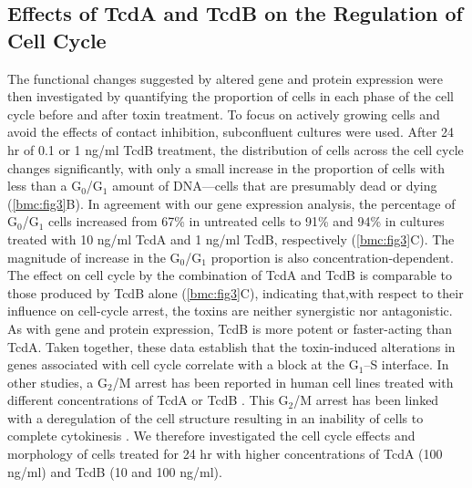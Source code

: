 \subsection{Effects of TcdA and TcdB on the Regulation of Cell Cycle}

The functional changes suggested by altered gene and protein 
expression were then investigated by quantifying the proportion 
of cells in each phase of the cell cycle before and after 
toxin treatment. To focus on actively growing cells and 
avoid the effects of contact inhibition, subconfluent 
cultures were used. After 24 hr of 0.1 or 1 ng/ml TcdB 
treatment, the distribution of cells across the cell 
cycle changes significantly, with only a small increase 
in the proportion of cells with less than a 
G$_{\text{0}}$/G$_{\text{1}}$ amount of DNA—cells 
that are presumably dead or dying (\autoref{bmc:fig3}B). 
In agreement with our gene expression analysis, the 
percentage of G$_{\text{0}}$/G$_{\text{1}}$ cells increased 
from 67\% in untreated cells to 91\% and 94\% in cultures 
treated with 10 ng/ml TcdA and 1 ng/ml TcdB, 
respectively (\autoref{bmc:fig3}C). The magnitude of 
increase in the G$_{\text{0}}$/G$_{\text{1}}$ proportion 
is also concentration-dependent. The effect on cell cycle 
by the combination of TcdA and TcdB is comparable to 
those produced by TcdB alone (\autoref{bmc:fig3}C), 
indicating that,with respect to their influence on cell-cycle 
arrest, the toxins are neither synergistic nor antagonistic. 
As with gene and protein expression, TcdB is more potent or 
faster-acting than TcdA. Taken together, these data 
establish that the toxin-induced alterations in genes 
associated with cell cycle correlate with a block at 
the G$_{\text{1}}$–S interface. In other studies, a 
G$_{\text{2}}$/M arrest has been reported in human cell 
lines treated with different concentrations of TcdA 
or TcdB \cite{Kim:2005km, Gerhard:2008wz, Nottrott:2007ep}. 
This G$_{\text{2}}$/M arrest has been linked with a 
deregulation of the cell structure resulting in an 
inability of cells to complete cytokinesis 
\cite{Huelsenbeck:2009di}. We therefore investigated 
the cell cycle effects and morphology of cells treated 
for 24 hr with higher concentrations of TcdA (100 ng/ml) 
and TcdB (10 and 100 ng/ml).

